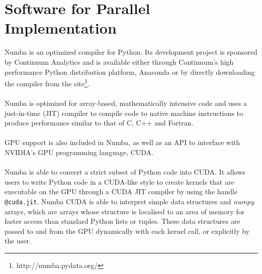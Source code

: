 \section{Software for Parallel Implementation}
Numba is an optimized compiler for Python. Its development project is sponsored by Continuum Analytics and is available either through Continuum's high performance Python distribution platform, Anaconda or by directly downloading the compiler from the site\footnote{http://numba.pydata.org/}.
\\
\\
Numba is optimized for array-based, mathematically intensive code and uses a just-in-time (JIT) compiler to compile code to native machine instructions to produce performance similar to that of C, C++ and Fortran.
\\
\\
GPU support is also included in Numba, as well as an API to interface with NVIDIA's GPU programming language, CUDA.
\\
\\
Numba is able to convert a strict subset of Python code into CUDA. It allows users to write Python code in a CUDA-like style to create kernels that are executable on the GPU through a CUDA JIT compiler by using the handle \texttt{@cuda.jit}. Numba CUDA is able to interpret simple data structures and \textit{numpy} arrays, which are arrays whose structure is localised to an area of memory for faster access than standard Python lists or tuples. These data structures are passed to and from the GPU dynamically with each kernel call, or explicitly by the user.